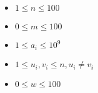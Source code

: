 \begin{itemize}
\tightlist
\item $1\leq n \leq 100$
\item $0\leq m \leq 100$
\item $1\leq a_i \leq 10^9$
\item $1\leq u_i,v_i \leq n, u_i\neq v_i$
\item $0\leq w \leq 100$
\end{itemize}
